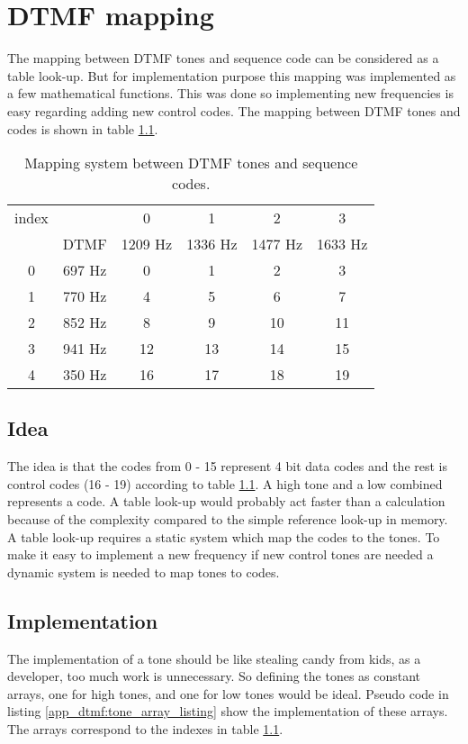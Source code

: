 \chapter{DTMF mapping}\label{app:physical_encode}
The mapping between DTMF tones and sequence code can be considered as a table look-up. But for implementation purpose this mapping was implemented as a few mathematical functions. This was done so implementing new frequencies is easy regarding adding new control codes. The mapping between DTMF tones and codes is shown in table \ref{app_dtmf:DTMF_mapping_table}.

\begin{table}[htb]
	\begin{center}
		\begin{tabular}{c c|c c c c}
 		index & & 0 & 1 & 2 & 3 \\
		& DTMF & 1209 Hz & 1336 Hz & 1477 Hz & 1633 Hz \\
		\hline
		0 & 697 Hz & 0 & 1 & 2 & 3 \\
		1 & 770 Hz & 4 & 5 & 6 & 7 \\
		2 & 852 Hz & 8 & 9 & 10 & 11 \\
		3 & 941 Hz & 12 & 13 & 14 & 15 \\
		4 & 350 Hz & 16 & 17 & 18 & 19 \\
		\end{tabular}
	\end{center}
	\caption{Mapping system between DTMF tones and sequence codes.}
	\label{app_dtmf:DTMF_mapping_table}
\end{table}

	\section{Idea}
	The idea is that the codes from 0 - 15 represent 4 bit data codes and the rest is control codes (16 - 19) according to table \ref{app_dtmf:DTMF_mapping_table}. A high tone and a low combined represents a code. A table look-up would probably act faster than a calculation because of the complexity compared to the simple reference look-up in memory. A table look-up requires a static system which map the codes to the tones. To make it easy to implement a new frequency if new control tones are needed a dynamic system is needed to map tones to codes.
	
	\section{Implementation}
	The implementation of a tone should be like stealing candy from kids, as a developer, too much work is unnecessary. So defining the tones as constant arrays, one for high tones, and one for low tones would be ideal. Pseudo code in listing \ref{app_dtmf:tone_array_listing} show the implementation of these arrays. The arrays correspond to the indexes in table \ref{app_dtmf:DTMF_mapping_table}.
	
